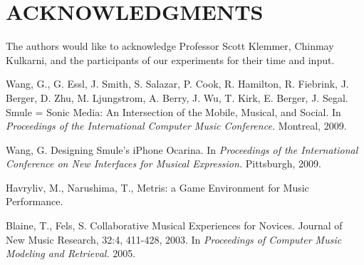 \documentclass{article}
\begin{document}
\section{ACKNOWLEDGMENTS}

The authors would like to acknowledge Professor Scott Klemmer, Chinmay Kulkarni, and the participants of our experiments for their time and input.

\begin{thebibliography}{9}

 Wang, G., G. Essl, J. Smith, S. Salazar, P. Cook, R. Hamilton, R. Fiebrink, J. Berger, D. Zhu, M. Ljungstrom, A. Berry, J. Wu, T. Kirk, E. Berger, J. Segal. Smule = Sonic Media: An Intersection of the Mobile, Musical, and Social.
In {\em Proceedings of the International Computer Music Conference.}
Montreal, 2009.

 Wang, G. Designing Smule's iPhone Ocarina.
In {\em Proceedings of the International Conference on New Interfaces for Musical Expression.}
Pittsburgh, 2009.


 Havryliv, M., Narushima, T., Metris: a Game Environment for Music Performance.

 Blaine, T., Fels, S. Collaborative Musical Experiences for Novices.
Journal of New Music Research, 32:4, 411-428, 2003.
In {\em Proceedings of Computer Music Modeling and Retrieval.}
2005.

\end{thebibliography}
\end{document}
